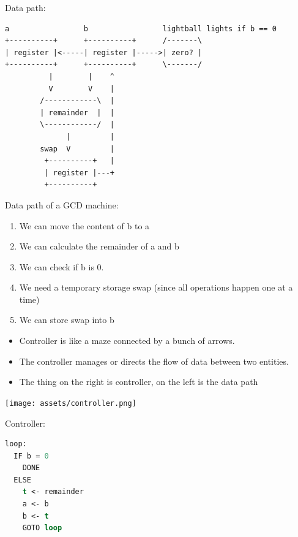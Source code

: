 \documentclass[a4paper,twoside]{article}
\numberwithin{equation}{section}
\begin{document}
Data path:
\begin{lstlisting}
a                 b                 lightball lights if b == 0
+----------+      +----------+      /-------\
| register |<-----| register |----->| zero? |
+----------+      +----------+      \-------/
          |        |    ^
          V        V    |
        /------------\  |
        | remainder  |  |
        \------------/  |
              |         |
        swap  V         |
         +----------+   |
         | register |---+
         +----------+

\end{lstlisting}
Data path of a GCD machine:
\begin{enumerate}
    \item We can move the content of b to a
    \item We can calculate the remainder of a and b
    \item We can check if b is 0.
    \item We need a temporary storage swap (since all operations happen one at a time)
    \item We can store swap into b
\end{enumerate}

\begin{itemize}
    \item Controller is like a maze connected by a bunch of arrows.
    \item The controller manages or directs the flow of data between two entities.
    \item The thing on the right is controller, on the left is the data path
\end{itemize}

\begin{center}
    \texttt{[image: assets/controller.png]}
\end{center}
Controller:
\begin{lstlisting}[language=Lisp]
  loop:
  IF b = 0
    DONE
  ELSE
    t <- remainder
    a <- b
    b <- t
    GOTO loop
\end{lstlisting}
\end{document}
